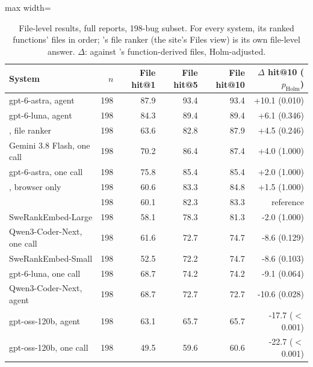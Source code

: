 \begin{table}[t]
\centering
\small
\caption{File-level results, full reports, 198-bug subset. For every system, its ranked functions' files in order; \tool{}'s file ranker (the site's Files view) is its own file-level answer. $\Delta$: against \toolgpu{}'s function-derived files, Holm-adjusted.}
\label{tab:files198}
\begin{adjustbox}{max width=\linewidth}\begin{tabular}{lrrrrr}
\toprule
System & $n$ & File hit@1 & File hit@5 & File hit@10 & $\Delta$ hit@10 ($p_{\mathrm{Holm}}$) \\
\midrule
gpt-6-astra, agent & 198 & 87.9 & 93.4 & 93.4 & +10.1 (0.010) \\
gpt-6-luna, agent & 198 & 84.3 & 89.4 & 89.4 & +6.1 (0.346) \\
\tool{}, file ranker & 198 & 63.6 & 82.8 & 87.9 & +4.5 (0.246) \\
Gemini 3.8 Flash, one call & 198 & 70.2 & 86.4 & 87.4 & +4.0 (1.000) \\
gpt-6-astra, one call & 198 & 75.8 & 85.4 & 85.4 & +2.0 (1.000) \\
\tool{}, browser only & 198 & 60.6 & 83.3 & 84.8 & +1.5 (1.000) \\
\toolgpu{} & 198 & 60.1 & 82.3 & 83.3 & reference \\
SweRankEmbed-Large & 198 & 58.1 & 78.3 & 81.3 & -2.0 (1.000) \\
Qwen3-Coder-Next, one call & 198 & 61.6 & 72.7 & 74.7 & -8.6 (0.129) \\
SweRankEmbed-Small & 198 & 52.5 & 72.2 & 74.7 & -8.6 (0.103) \\
gpt-6-luna, one call & 198 & 68.7 & 74.2 & 74.2 & -9.1 (0.064) \\
Qwen3-Coder-Next, agent & 198 & 68.7 & 72.7 & 72.7 & -10.6 (0.028) \\
gpt-oss-120b, agent & 198 & 63.1 & 65.7 & 65.7 & -17.7 ($<$0.001) \\
gpt-oss-120b, one call & 198 & 49.5 & 59.6 & 60.6 & -22.7 ($<$0.001) \\
\bottomrule
\end{tabular}\end{adjustbox}
\end{table}
